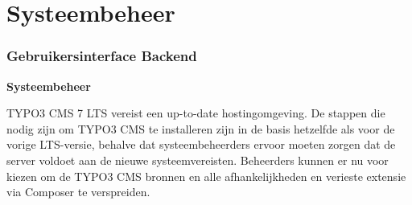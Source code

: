 %

\section{Systeembeheer}
\begin{frame}[fragile]
	\frametitle{Gebruikersinterface Backend}

	\begin{center}\huge{\color{typo3darkgrey}\textbf{Systeembeheer}}\end{center}

	TYPO3 CMS 7 LTS vereist een up-to-date hostingomgeving.
	De stappen die nodig zijn om TYPO3 CMS te installeren zijn in de basis hetzelfde
	als voor de vorige LTS-versie, behalve dat systeembeheerders ervoor moeten zorgen
	dat de server voldoet aan de nieuwe systeemvereisten.\newline
	Beheerders kunnen er nu voor kiezen om de TYPO3 CMS bronnen en alle
	afhankelijkheden en verieste extensie via Composer te verspreiden.

\end{frame}

